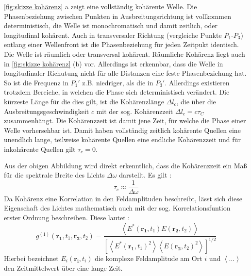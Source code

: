 \autoref{fig:skizze kohärenz} a zeigt eine vollständig kohärente Welle. Die Phasenbeziehung zwischen Punkten in Ausbreitungsrichtung ist vollkommen deterministisch, die Welle ist monochromatisch und damit zeitlich, oder longitudinal kohärent. 
Auch in transversaler Richtung (vergleiche Punkte $P_1$-$P_3$) entlang einer Wellenfront ist die Phasenbeziehung für jeden Zeitpukt identisch. 
Die Welle ist räumlich oder transversal kohärent. 
Räumliche Kohärenz liegt auch in \autoref{fig:skizze kohärenz} (b) vor. 
Allerdings ist erkennbar, dass die Welle in longitudinaler Richutung nicht für alle Distanzen eine feste Phasenbeziehung hat. 
So ist die Frequenz in $P_1'$ z.B. niedriger, als die in $P_3'$. 
Allerdings existieren trotzdem Bereiche, in welchen die Phase sich deterministisch verändert. 
Die kürzeste Länge für die dies gilt, ist die Kohärenzlänge $\Delta l_c$, die über die Ausbreitungsgeschwindigkeit $c$ mit der sog. Kohärenzzeit $\Delta l_c = c\tau_C$ zusammenhängt. 
Die Kohärenzzeit ist damit jene Zeit, für welche die Phase einer Welle vorhersehbar ist. 
Damit haben vollständig zeitlich kohärente Quellen eine unendlich lange, teilweise kohärente Quellen eine endliche Kohärenzzeit und für inkohärente Quellen gilt $\tau_c =0$. 

Aus der obigen Abbildung wird direkt erkenntlich, dass die Kohärenzzeit ein Maß für die spektrale Breite des Lichts $\Delta \omega$ darstellt. 
Es gilt \cite{fox_quantum_2006}:
\begin{equation}
    \tau_c  \approx \frac{1}{\Delta \omega}
\end{equation}
Da Kohärenz eine Korrelation in den Feldamplituden beschreibt, lässt sich diese Eigenschaft des Lichtes mathematisch auch mit der sog. Korrelationsfuntion erster Ordnung beschreiben. 
Diese lautet \cite{foellmi_intensity_2009}:
\begin{equation}
    g^{(1)}(\mathbf{r_1}, t_1, \mathbf{r_2}, t_2) = \frac{\left<E^*(\mathbf{r_1}, t_1)E(\mathbf{r_2}, t_2)\right>}{\left[\left<E^*(\mathbf{r_1}, t_1)^2\right> \left<E(\mathbf{r_2}, t_2)^2\right>\right]^{1/2}}
    \label{eq:g1(r,t)}
\end{equation}
Hierbei bezeichnet $E_i(\mathbf{r_i},t_i)$ die komplexe Feldamplitude am Ort $i$ und $\left<\dots\right>$ den Zeitmittelwert über eine lange Zeit. 

